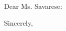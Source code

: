 \documentclass[nosignature,noletterhead]{letter-ur}
\begin{document}
Dear Ms. Savarese:



Sincerely,
\end{document}
